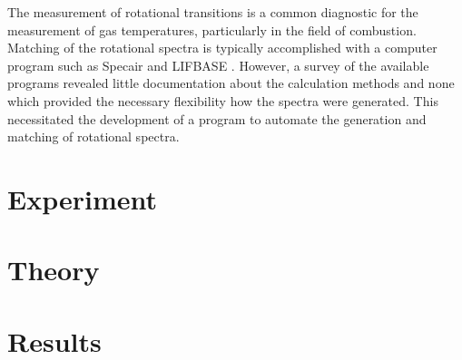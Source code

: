 The measurement of rotational transitions is a common diagnostic for the
measurement of gas temperatures, particularly in the field of combustion.
Matching of the rotational spectra is typically accomplished with a computer
program such as Specair \cite{Laux2002} and LIFBASE \cite{Luque1999}. However, a
survey of the available programs revealed little documentation about the
calculation methods and none which provided the necessary flexibility how the
spectra were generated. This necessitated the development of a program to
automate the generation and matching of rotational spectra.

\section{Experiment}



\section{Theory}



\section{Results}





